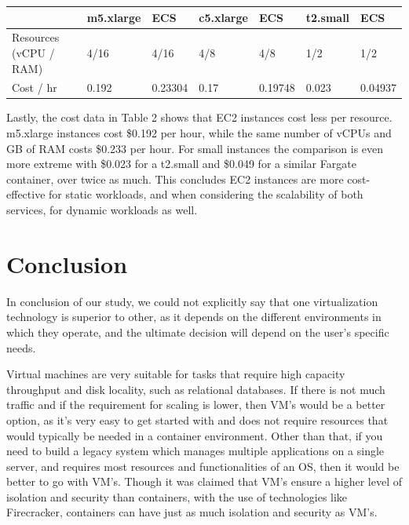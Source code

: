 \documentclass[11pt]{article}
\begin{document}
\begin{table}[hbt!]
  \begin{tabular}{|l|l|l|l|l|l|l|}
  \hline
                         & m5.xlarge & ECS     & c5.xlarge  & ECS     & t2.small  & ECS     \\ \hline
  Resources (vCPU / RAM) & 4/16      & 4/16    & 4/8        & 4/8     & 1/2       & 1/2     \\ \hline
  Cost / hr              & 0.192     & 0.23304 & 0.17       & 0.19748 & 0.023     & 0.04937 \\ \hline
  \end{tabular}
\end{table}

Lastly, the cost data in Table 2 shows that EC2 instances cost less per resource. m5.xlarge instances cost \$0.192 per hour, while the same number of vCPUs and GB of RAM costs \$0.233 per hour. For small instances the comparison is even more extreme with \$0.023 for a t2.small and \$0.049 for a similar Fargate container, over twice as much. This concludes EC2 instances are more cost-effective for static workloads, and when considering the scalability of both services, for dynamic workloads as well.

\vspace{3mm} %


\section{Conclusion}

In conclusion of our study, we could not explicitly say that one virtualization technology is superior to other, as it depends on the different environments in which they operate, and the ultimate decision will depend on the user's specific needs. 

Virtual machines are very suitable for tasks that require high capacity throughput and disk locality, such as relational databases. If there is not much traffic and if the requirement for scaling is lower, then VM's would be a better option, as it's very easy to get started with and does not require resources that would typically be needed in a container environment. Other than that, if you need to build a legacy system which manages multiple applications on a single server, and requires most resources and functionalities of an OS, then it would be better to go with VM's. Though it was claimed that VM's ensure a higher level of isolation and security than containers, with the use of technologies like Firecracker, containers can have just as much isolation and security as VM's.
\end{document}
